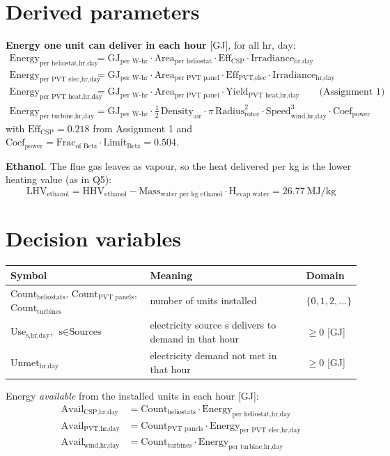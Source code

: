 \documentclass[11pt,a4paper]{article}
\newcommand{\T}[1]{\text{#1}}
\begin{document}
\section{Derived parameters}
\textbf{Energy one unit can deliver in each hour} [GJ], for all $\T{hr}$, $\T{day}$:
\begin{align*}
\T{Energy}_{\T{per heliostat,hr,day}} &= \T{GJ}_{\T{per W-hr}}\cdot\T{Area}_{\T{per heliostat}}\cdot\T{Eff}_{\T{CSP}}\cdot\T{Irradiance}_{\T{hr,day}}\\
\T{Energy}_{\T{per PVT elec,hr,day}} &= \T{GJ}_{\T{per W-hr}}\cdot\T{Area}_{\T{per PVT panel}}\cdot\T{Eff}_{\T{PVT,elec}}\cdot\T{Irradiance}_{\T{hr,day}}\\
\T{Energy}_{\T{per PVT heat,hr,day}} &= \T{GJ}_{\T{per W-hr}}\cdot\T{Area}_{\T{per PVT panel}}\cdot\T{Yield}_{\T{PVT heat,hr,day}}\qquad\text{(Assignment 1)}\\
\T{Energy}_{\T{per turbine,hr,day}} &= \T{GJ}_{\T{per W-hr}}\cdot\tfrac12\,\T{Density}_{\T{air}}\cdot\pi\,\T{Radius}_{\T{rotor}}^2\cdot\T{Speed}_{\T{wind,hr,day}}^3\cdot\T{Coef}_{\T{power}}
\end{align*}
with $\T{Eff}_{\T{CSP}}=0.218$ from Assignment 1 and $\T{Coef}_{\T{power}}=\T{Frac}_{\T{of Betz}}\cdot\T{Limit}_{\T{Betz}}=0.504$.

\textbf{Ethanol}. The flue gas leaves as vapour, so the heat delivered per kg is the lower heating value (as in Q5):
\[
\T{LHV}_{\T{ethanol}}=\T{HHV}_{\T{ethanol}}-\T{Mass}_{\T{water per kg ethanol}}\cdot\T{H}_{\T{evap water}}=26.77\ \text{MJ/kg}
\]

\section{Decision variables}
\begin{tabular}{@{}p{}p{}p{}@{}}
\toprule
Symbol & Meaning & Domain\\\midrule
$\T{Count}_{\T{heliostats}}$, $\T{Count}_{\T{PVT panels}}$, $\T{Count}_{\T{turbines}}$ & number of units installed & $\{0,1,2,\dots\}$\\
$\T{Use}_{\T{s,hr,day}}$, $\T{s}\in\T{Sources}$ & electricity source $\T{s}$ delivers to demand in that hour & $\ge 0$ [GJ]\\
$\T{Unmet}_{\T{hr,day}}$ & electricity demand not met in that hour & $\ge 0$ [GJ]\\
\bottomrule
\end{tabular}

\vspace{4pt}Energy \emph{available} from the installed units in each hour [GJ]:
\begin{align*}
\T{Avail}_{\T{CSP,hr,day}}&=\T{Count}_{\T{heliostats}}\cdot\T{Energy}_{\T{per heliostat,hr,day}}\\
\T{Avail}_{\T{PVT,hr,day}}&=\T{Count}_{\T{PVT panels}}\cdot\T{Energy}_{\T{per PVT elec,hr,day}}\\
\T{Avail}_{\T{wind,hr,day}}&=\T{Count}_{\T{turbines}}\cdot\T{Energy}_{\T{per turbine,hr,day}}
\end{align*}
\end{document}
